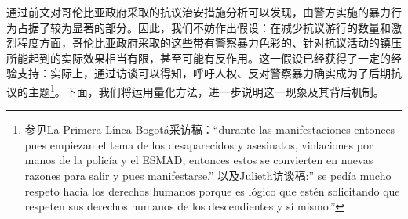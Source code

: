 \documentclass{phyasgn}\usepackage{nag}
\begin{document}
\par 通过前文对哥伦比亚政府采取的抗议治安措施分析可以发现，由警方实施的暴力行为占据了较为显著的部分。因此，我们不妨作出假设：在减少抗议游行的数量和激烈程度方面，哥伦比亚政府采取的这些带有警察暴力色彩的、针对抗议活动的镇压所能起到的实际效果相当有限，甚至可能有反作用。这一假设已经获得了一定的经验支持：实际上，通过访谈可以得知，呼吁人权、反对警察暴力确实成为了后期抗议的主题\footnote[65]{参见La Primera Línea Bogotá采访稿：“durante las manifestaciones entonces pues empiezan el tema de los desaparecidos y asesinatos, violaciones por manos de la policía y el ESMAD, entonces estos se convierten en nuevas razones para salir y pues manifestarse.” 以及Julieth访谈稿:” se pedía mucho respeto hacia los derechos humanos porque es lógico que estén solicitando que respeten sus derechos humanos de los descendientes y sí mismo.”}。下面，我们将运用量化方法，进一步说明这一现象及其背后机制。
\end{document}
